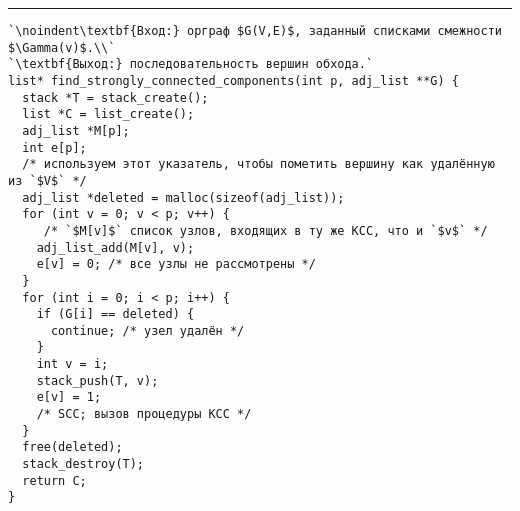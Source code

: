 \documentclass{article}
\begin{document}
\vspace{5pt} \hrule
\begin{lstlisting}[caption={Выделение компонент сильной связности}, label=p283_scc, escapechar=`]
`\noindent\textbf{Вход:} орграф $G(V,E)$, заданный списками смежности $\Gamma(v)$.\\`
`\textbf{Выход:} последовательность вершин обхода.`
list* find_strongly_connected_components(int p, adj_list **G) {
  stack *T = stack_create();
  list *C = list_create();
  adj_list *M[p];
  int e[p];
  /* используем этот указатель, чтобы пометить вершину как удалённую из `$V$` */
  adj_list *deleted = malloc(sizeof(adj_list));
  for (int v = 0; v < p; v++) {
     /* `$M[v]$` список узлов, входящих в ту же КСС, что и `$v$` */
    adj_list_add(M[v], v);
    e[v] = 0; /* все узлы не рассмотрены */
  }
  for (int i = 0; i < p; i++) {
    if (G[i] == deleted) {
      continue; /* узел удалён */
    }
    int v = i;
    stack_push(T, v);
    e[v] = 1;
    /* SCC; вызов процедуры КСС */
  }
  free(deleted);
  stack_destroy(T);
  return C;
}
\end{lstlisting}
\end{document}
